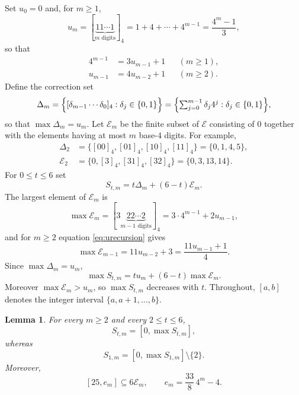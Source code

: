 \documentclass[12pt]{article}
\theoremstyle{plain}
\newtheorem{lemma}[theorem]{Lemma}
\begin{document}
Set $u_0=0$ and, for $m\geq1$,
\begin{equation}\label{eq:umdef}
 u_m=[\underbrace{11\cdots1}_{m\text{ digits}}]_4
    =1+4+\cdots+4^{m-1}=\frac{4^m-1}{3},
\end{equation}
so that
\begin{equation}\label{eq:urecursion}
\begin{aligned}
 4^{m-1}&=3u_{m-1}+1 &&(m\geq1),\\
 u_{m-1}&=4u_{m-2}+1 &&(m\geq2).
\end{aligned}
\end{equation}
Define the correction set
\[
 \Delta_m=\Bigl\{[\delta_{m-1}\cdots\delta_0]_4:\delta_j\in\{0,1\}\Bigr\}
    =\Bigl\{\textstyle\sum_{j=0}^{m-1}\delta_j4^j:\delta_j\in\{0,1\}\Bigr\},
\]
so that $\max \Delta_m=u_m$.  Let $\mathcal E_m$ be the finite subset of
$\mathcal E$ consisting of $0$ together with the elements having at most
$m$ base-$4$ digits.  For example,
\[
\begin{aligned}
 \Delta_2&=\{[00]_4,[01]_4,[10]_4,[11]_4\}=\{0,1,4,5\},\\
 \mathcal E_2&=\{0,[3]_4,[31]_4,[32]_4\}=\{0,3,13,14\}.
\end{aligned}
\]
For $0\leq t\leq6$ set
\[
        S_{t,m}=t\Delta_m+(6-t)\mathcal E_m .
\]
The largest element of $\mathcal E_m$ is
\[
 \max\mathcal E_m=[3\underbrace{22\cdots2}_{m-1\text{ digits}}]_4
                =3\cdot4^{m-1}+2u_{m-1},
\]
and for $m\geq2$ equation \eqref{eq:urecursion} gives
\begin{equation}\label{eq:maxErecursion}
 \max\mathcal E_{m-1}=11u_{m-2}+3=\frac{11u_{m-1}+1}{4}.
\end{equation}
Since $\max \Delta_m=u_m$,
\begin{equation}\label{eq:maxStm}
 \max S_{t,m}=tu_m+(6-t)\max\mathcal E_m .
\end{equation}
Moreover $\max\mathcal E_m>u_m$, so $\max S_{t,m}$ decreases with $t$.
Throughout, $[a,b]$ denotes the integer interval $\{a,a+1,\ldots,b\}$.

\begin{lemma}\label{lem:mixed}
For every $m\geq2$ and every $2\leq t\leq6$,
\begin{equation}\label{eq:mixedtge}
 S_{t,m}=[0,\max S_{t,m}],
\end{equation}
whereas
\begin{equation}\label{eq:mixedtone}
 S_{1,m}=[0,\max S_{1,m}]\setminus\{2\}.
\end{equation}
Moreover,
\begin{equation}\label{eq:mixedEminterval}
 [25,e_m]\subseteq6\mathcal E_m,\qquad e_m=\frac{33}{8}\,4^m-4 .
\end{equation}
\end{lemma}
\end{document}
